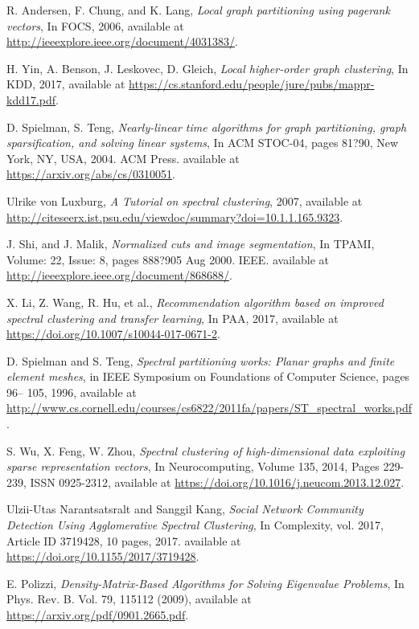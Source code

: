 \documentclass[11pt]{article}
\begin{document}
\begin{thebibliography}{10}

	R. Andersen, F. Chung, and K. Lang,
	\emph{Local graph partitioning using pagerank vectors},
	In FOCS, 2006,
	available at \url{http://ieeexplore.ieee.org/document/4031383/}.

	H. Yin, A. Benson, J. Leskovec, D. Gleich,
	\emph{Local higher-order graph clustering},
	In KDD, 2017,
	available at \url{https://cs.stanford.edu/people/jure/pubs/mappr-kdd17.pdf}.

	D. Spielman, S. Teng,
	\emph{Nearly-linear time algorithms for graph partitioning, graph sparsification, and solving linear systems},
	In ACM STOC-04, pages 81?90, New York, NY, USA, 2004. ACM Press.
	available at \url{https://arxiv.org/abs/cs/0310051}.
    
	Ulrike von Luxburg, 
    \emph{A Tutorial on spectral clustering}, 
    2007,
    available at \url{http://citeseerx.ist.psu.edu/viewdoc/summary?doi=10.1.1.165.9323}.

	J. Shi, and J. Malik,
	\emph{Normalized cuts and image segmentation},
	In TPAMI, Volume: 22, Issue: 8, pages 888?905 Aug 2000. IEEE.
	available at \url{http://ieeexplore.ieee.org/document/868688/}.
    
	X. Li, Z. Wang, R. Hu, et al.,
    \emph{Recommendation algorithm based on improved spectral clustering and transfer learning},
    In PAA, 2017,
    available at \url{https://doi.org/10.1007/s10044-017-0671-2}.

	D. Spielman and S. Teng,
    \emph{Spectral partitioning works: Planar graphs and
finite element meshes},
	in IEEE Symposium on Foundations of Computer Science, pages 96–
105, 1996,
	available at \url{http://www.cs.cornell.edu/courses/cs6822/2011fa/papers/ST_spectral_works.pdf}.

	S. Wu, X. Feng, W. Zhou,
    \emph{Spectral clustering of high-dimensional data exploiting sparse representation vectors},
    In Neurocomputing, Volume 135, 2014, Pages 229-239, ISSN 0925-2312, 		available at \url{https://doi.org/10.1016/j.neucom.2013.12.027}.

    Ulzii-Utas Narantsatsralt and Sanggil Kang,
    \emph{Social Network Community Detection Using Agglomerative Spectral Clustering}, 
    In Complexity, vol. 2017, Article ID 3719428, 10 pages, 2017. 
    available at \url{https://doi.org/10.1155/2017/3719428}.

	E. Polizzi, 
	\emph{Density-Matrix-Based Algorithms for Solving Eigenvalue Problems}, 
	In Phys. Rev. B. Vol. 79, 115112 (2009),
    available at \url{https://arxiv.org/pdf/0901.2665.pdf}.


\end{thebibliography}
\end{document}
